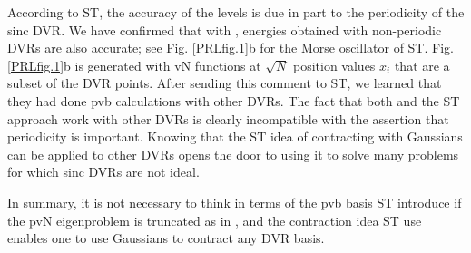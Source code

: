 According to  ST, the accuracy of the  levels  is due in part  to the
 periodicity of the  sinc DVR.  We have confirmed that with  , energies obtained with 
non-periodic DVRs \cite{Light2000}  are also accurate; see  Fig. \ref{PRLfig.1}b  for the Morse oscillator of ST. 
 Fig. \ref{PRLfig.1}b is  generated with   vN  functions 
  at $\sqrt{N}$ position values $x_i$ that are  a subset of the    DVR  points. %
%
After sending this comment to ST,   we learned that they had done pvb calculations with other DVRs.   \cite{Shimshovitz2014b}  
The fact that both   and the ST approach work with other DVRs  is clearly incompatible with 
 the assertion  that periodicity is important.  
% 
%
Knowing that the ST idea of contracting with Gaussians can be applied to other DVRs opens the door to using it to solve many problems
for which      sinc DVRs are not ideal.  
%
% 
%



In summary, it  is not necessary to think in terms of the  pvb basis ST  introduce if the pvN eigenproblem is truncated as in ,   and 
 the contraction idea ST use   enables one to use Gaussians to contract any DVR basis. %
%



%

